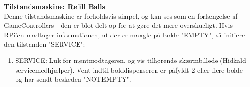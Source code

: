 \documentclass[Arkitektur/System_main.tex]{subfiles}
\begin{document}
\textbf{Tilstandsmaskine: Refill Balls}\\
Denne tilstandsmaskine er forholdsvis simpel, og kan ses som en forlængelse af GameControllers - den er blot delt op for at gøre det mere overskueligt. Hvis RPi'en modtager informationen, at der er mangle på bolde "EMPTY", så initiere den tilstanden "SERVICE": 
\begin{enumerate}
    \item SERVICE: Luk for møntmodtageren, og vis tilhørende skærmbillede (Hidkald servicemedhjælper). Vent indtil bolddispenseren er påfyldt 2 eller flere bolde og har sendt beskeden "NOTEMPTY". 
\end{enumerate}

\end{document}
